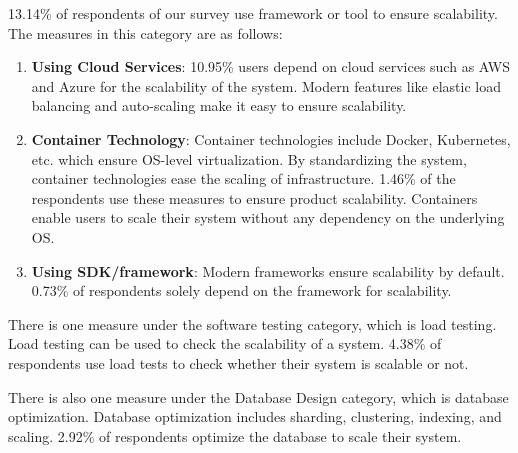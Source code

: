  13.14\% of respondents of our survey use framework or tool to ensure scalability. The measures in this category are as follows:
\begin{enumerate}[label=(\alph*)]

    \item \textbf{Using Cloud Services}: 10.95\% users depend on cloud services such as AWS and Azure for the scalability of the system. Modern features like elastic load balancing and auto-scaling make it easy to ensure scalability.
    
    \item \textbf{Container Technology}: Container technologies include Docker, Kubernetes, etc. which ensure OS-level virtualization. By standardizing the system, container technologies ease the scaling of infrastructure. 1.46\% of the respondents use these measures to ensure product scalability. Containers enable users to scale their system without any dependency on the underlying OS.
    
    \item \textbf{Using SDK/framework}: Modern frameworks ensure scalability by default. 0.73\% of respondents solely depend on the framework for scalability.
  
\end{enumerate}
 
 
There is one measure under the software testing category, which is load testing. Load testing can be used to check the scalability of a system. 4.38\% of respondents use load tests to check whether their system is scalable or not.

There is also one measure under the Database Design category, which is database optimization. Database optimization includes sharding, clustering, indexing, and scaling. 2.92\% of respondents optimize the database to scale their system.
